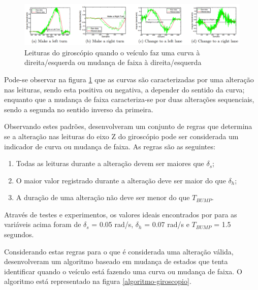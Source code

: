 \begin{figure}[h]
\centering
\includegraphics[width=1\textwidth]{images/leituras-giroscopio.png}
\caption{Leituras do giroscópio quando o veículo faz uma curva à direita/esquerda ou mudança de faixa à direita/esquerda \cite{chen2015invisible}}
\label{leituras-giroscopio}
\end{figure}

Pode-se observar na figura \ref{leituras-giroscopio} que as curvas são caracterizadas por uma alteração nas leituras, sendo esta positiva ou negativa,
a depender do sentido da curva; enquanto que a mudança de faixa caracteriza-se por duas alterações sequenciais, sendo a segunda no sentido inverso
da primeira.

Observando estes padrões,  desenvolveram um conjunto de regras que determina se a alteração nas leituras do eixo Z do
giroscópio pode ser considerada um indicador de curva ou mudança de faixa. As regras são as seguintes:

\begin{enumerate}
  \item Todas as leituras durante a alteração devem ser maiores que $\delta_{s}$;
  \item O maior valor registrado durante a alteração deve ser maior do que $\delta_{h}$;
  \item A duração de uma alteração não deve ser menor do que $T_{BUMP}$.
\end{enumerate}

Através de testes e experimentos, os valores ideais encontrados por  para as variáveis acima foram de $\delta_{s}$ = 0.05 rad/s,
$\delta_{h}$ = 0.07 rad/s e $T_{BUMP}$ = 1.5 segundos.

Considerando estas regras para o que é considerada uma alteração válida,  desenvolveram um algoritmo baseado em mudança de estados
que tenta identificar quando o veículo está fazendo uma curva ou mudança de faixa. O algoritmo está representado na figura \ref{algoritmo-giroscopio}.

